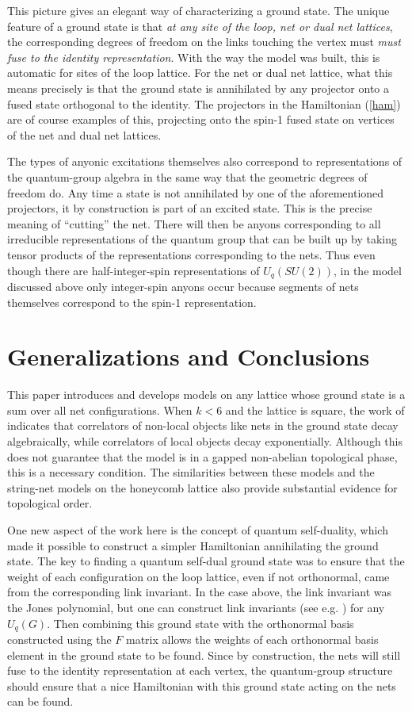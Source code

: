\documentclass[11pt]{article}
\begin{document}
This picture gives an elegant way of characterizing a ground
state. The unique feature of a ground state is that {\em at any
site of the loop, net or dual net lattices}, the corresponding
degrees of freedom on the links touching the vertex must {\em must
fuse to the identity representation}. With the way the model was
built, this is automatic for sites of the loop lattice. For the net
or dual net lattice, what this means precisely is that the ground
state is annihilated by any projector onto a fused state orthogonal to
the identity. The projectors in the Hamiltonian (\ref{ham}) are of
course examples of this, projecting onto the spin-1 fused state on
vertices of the net and dual net lattices.

The types of anyonic excitations themselves also correspond to
representations of the quantum-group algebra in the same way that the
geometric degrees of freedom do. Any time a
state is not annihilated by one of the aforementioned projectors, it
by construction is part of an excited state. This
is the precise meaning of ``cutting'' the net. There will then
be anyons corresponding to all irreducible representations of the
quantum group that can be built up by taking tensor products of the
representations corresponding to the nets. Thus even though there
are half-integer-spin representations of $U_q(SU(2))$, in the model
discussed above only integer-spin anyons occur because segments of
nets themselves correspond to the spin-1 representation.


\section{Generalizations and Conclusions}
\label{sec:generalizations}

This paper introduces and develops models on any lattice whose ground
state is a sum over all net configurations. When $k<6$ and the lattice
is square, the work of \cite{FJ} indicates that correlators of
non-local objects like nets in the ground state decay algebraically,
while correlators of local objects decay exponentially. Although this
does not guarantee that the model is in a gapped non-abelian
topological phase, this is a necessary condition. The similarities
between these models and the string-net models on the honeycomb
lattice also provide substantial evidence for topological order.

One new aspect of the work here is the concept of quantum
self-duality, which made it possible to construct a simpler
Hamiltonian annihilating the ground state. The key to finding a
quantum self-dual ground state was to ensure that the weight of each
configuration on the loop lattice, even if not orthonormal, came from
the corresponding link invariant. In the case above, the link
invariant was the Jones polynomial, but one can construct link
invariants (see e.g. \cite{Kuperberg}) for any $U_q(G)$. Then
combining this ground state with the orthonormal basis constructed
using the $F$ matrix allows the weights of each orthonormal basis
element in the ground state to be found. Since by construction, the
nets will still fuse to the identity representation at each vertex,
the quantum-group structure should ensure that a nice Hamiltonian with
this ground state acting on the nets can be found.
\end{document}
